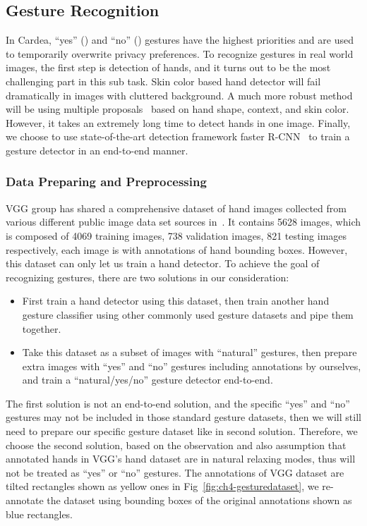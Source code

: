 \subsection{Gesture Recognition}
In Cardea, ``yes'' () and ``no'' () gestures have the highest priorities and are used to temporarily overwrite privacy preferences. To recognize gestures in real world images, the first step is detection of hands, and it turns out to be the most challenging part in this sub task. Skin color based hand detector will fail dramatically in images with cluttered background. A much more robust method will be using multiple proposals~\cite{mittal2011hand} based on hand shape, context, and skin color. However, it takes an extremely long time to detect hands in one image. Finally, we choose to use state-of-the-art detection framework faster R-CNN~\cite{ren2015faster} to train a gesture detector in an end-to-end manner.

\subsubsection{Data Preparing and Preprocessing}


VGG group has shared a comprehensive dataset of hand images collected from various different public image data set sources in~\cite{mittal2011hand, links:vgghanddataset}. It contains 5628 images, which is composed of 4069 training images, 738 validation images, 821 testing images respectively, each image is with annotations of hand bounding boxes. However, this dataset can only let us train a hand detector. To achieve the goal of recognizing gestures, there are two solutions in our consideration:

\begin{itemize}
\item First train a hand detector using this dataset, then train another hand gesture classifier using other commonly used gesture datasets and pipe them together.
\item Take this dataset as a subset of images with ``natural'' gestures, then prepare extra images with ``yes'' and ``no'' gestures including annotations by ourselves, and train a ``natural/yes/no'' gesture detector end-to-end.
\end{itemize}

The first solution is not an end-to-end solution, and the specific ``yes'' and ``no'' gestures may not be included in those standard gesture datasets, then we will still need to prepare our specific gesture dataset like in second solution. Therefore, we choose the second solution, based on the observation and also assumption that annotated hands in VGG's hand dataset are in natural relaxing modes, thus will not be treated as ``yes'' or ``no'' gestures. The annotations of VGG dataset are tilted rectangles shown as yellow ones in Fig~\ref{fig:ch4-gesturedataset}, we re-annotate the dataset using bounding boxes of the original annotations shown as blue rectangles.

